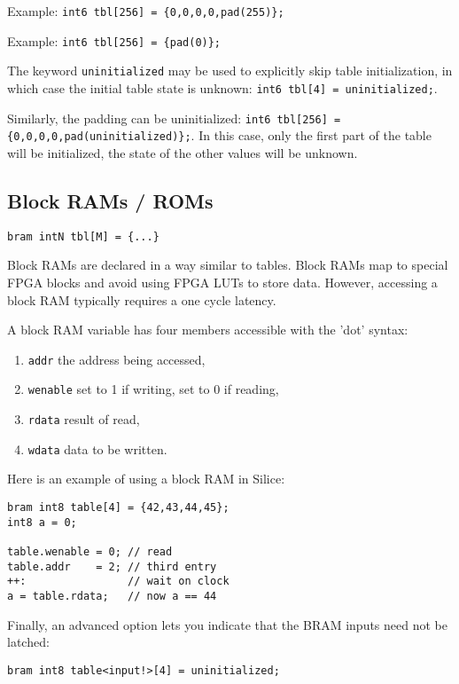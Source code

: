 \documentclass[a4]{article}
\newcommand\silice{Silice}
\begin{document}
\noindent Example:  \texttt{int6 tbl[256] = \{0,0,0,0,pad(255)\};}

\noindent Example:  \texttt{int6 tbl[256] = \{pad(0)\};}

The keyword \texttt{uninitialized} may be used to explicitly skip table initialization, in which case the initial table state is unknown: \texttt{int6 tbl[4] = uninitialized;}. 

Similarly, the padding can be uninitialized: 
\texttt{int6 tbl[256] = \{0,0,0,0,pad(uninitialized)\};}.
In this case, only the first part of the table will be initialized, the state of the other values will be unknown.

\subsection{Block RAMs / ROMs}

\texttt{bram intN tbl[M] = \{...\} }

\noindent Block RAMs are declared in a way similar to tables. Block RAMs map to special FPGA blocks and avoid using FPGA LUTs to store data. However, accessing a block RAM typically requires a one cycle latency.

A block RAM variable has four members accessible with the 'dot' syntax: 
\begin{enumerate}
	\item {\tt addr} the address being accessed,
	\item {\tt wenable} set to 1 if writing, set to 0 if reading,
	\item {\tt rdata} result of read,
	\item {\tt wdata} data to be written.
\end{enumerate}

Here is an example of using a block RAM in \silice{}:

\begin{verbatim}
bram int8 table[4] = {42,43,44,45};
int8 a = 0;

table.wenable = 0; // read
table.addr    = 2; // third entry
++:                // wait on clock
a = table.rdata;   // now a == 44
\end{verbatim}

Finally, an advanced option lets you indicate that the BRAM inputs need
not be latched:
\begin{verbatim}
bram int8 table<input!>[4] = uninitialized;
\end{verbatim}
\end{document}
